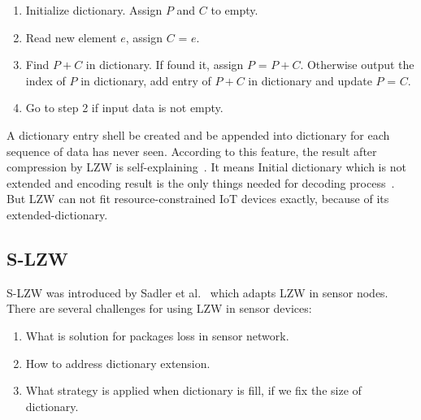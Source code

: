 \begin{enumerate}
    \item Initialize dictionary. Assign $P$ and $C$ to empty.
    \item Read new element $e$, assign $C$ = $e$.
    \item Find $P+C$ in dictionary. If found it, assign $P$ = $P+C$. Otherwise
    output the index of $P$ in dictionary, add entry of $P+C$ in dictionary and
    update $P$ = $C$.
    \item Go to step 2 if input data is not empty.
\end{enumerate}

A dictionary entry shell be created and be appended into dictionary for each
sequence of data has never seen. According to this feature, the result after
compression by LZW is self-explaining~\cite{welch1984technique}. It means
Initial dictionary which is not extended and encoding result is the only things
needed for decoding process~\cite{welch1984technique}. But LZW can not fit
resource-constrained IoT devices exactly, because of its extended-dictionary.

\subsection{S-LZW}
S-LZW was introduced by Sadler et al.~\cite{sadler2006data} which adapts LZW in
sensor nodes. There are several challenges for using LZW in sensor devices:
\begin{enumerate}
    \item What is solution for packages loss in sensor network.
    \item How to address dictionary extension.
    \item What strategy is applied when dictionary is fill, if we fix the size
    of dictionary.
\end{enumerate}

